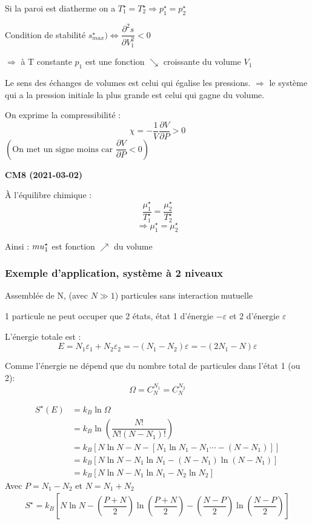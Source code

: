 \documentclass[12pt,a4paper]{report}
\begin{document}
Si la paroi est diatherme on a \(T_1^\star = T_2^\star \Rightarrow p^\star_1 = p^\star_2\)

Condition de stabilité \(s^\star_{max}) \Leftrightarrow \dfrac{\partial^2 s}{\partial V_1^2} < 0\)

\(\Rightarrow \) à T constante \(p_1\) est une fonction \(\searrow\) croissante du volume \(V_1\)


Le sens des échanges de volumes est celui qui égalise les pressions. \(\Rightarrow\) le système qui a la pression initiale la plus grande est celui qui gagne du volume.

On exprime la compressibilité :
\[
	\chi = - \dfrac{1}{V} \dfrac{\partial V}{\partial P} > 0
\]
\(\left( \text{On met un signe moins car } \dfrac{\partial V}{\partial P} < 0 \right)\)

\begin{center}
\textbf{CM8 (2021-03-02)}
\end{center}

À l'équilibre chimique :
\[
	\dfrac{\mu_1^\star}{T_1^\star} = \dfrac{\mu_2^\star}{T_2^\star}
\]
\[
	\Rightarrow \mu_1^\star = \mu_2^\star
\]

Ainsi : $\\mu_1^\star$ est fonction $\nearrow$ du volume

\subsubsection{Exemple d'application, système à 2 niveaux}

Assemblée de N, (avec $N \gg 1$) particules sans interaction mutuelle

1 particule ne peut occuper que 2 états, état 1 d'énergie $-\varepsilon$ et 2 d'énergie $\varepsilon$

L'énergie totale est :
\[
	E = N_1 \varepsilon_1 + N_2 \varepsilon_2 = -(N_1 - N_2)\varepsilon =-(2N_1 - N) \varepsilon
\]

Comme l'énergie ne dépend que du nombre total de particules dans l'état 1 (ou 2):
\[
	\Omega = C_N^{N_1} = C_N^{N_2}
\]

\begin{align*}
	S^\star(E) &= k_B \ln \Omega\\
	&= k_B \ln \left( \dfrac{N!}{N!(N-N_1)!} \right)\\
	&= k_B [ N \ln N - N - [ N_1 \ln N_1 - N_1 \cdots - (N - N_1)]]\\
	&= k_B [ N \ln N - N_1 \ln N_1 - (N -N_1) \ln (N-N_1)]\\
	&= k_B [N \ln N - N_1 \ln N_1 - N_2 \ln N_2]
\end{align*}
Avec $P = N_1 -N_2$ et $N = N_1 + N_2$
\begin{align*}
	S^\star = k_B [N  \ln N - \left( \dfrac{P + N}{2} \right)\ln\left( \dfrac{P + N}{2} \right) - \left( \dfrac{N - P}{2} \right) \ln \left( \dfrac{N - P}{2} \right)]
\end{align*}
\end{document}
